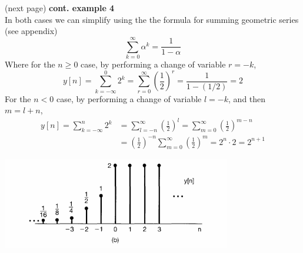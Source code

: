 \documentclass{report}
\begin{document}
(next page)\newpage
\noindent\textbf{cont. example 4}\\
In both cases we can simplify using the the formula for summing geometric series (see appendix)
\begin{equation*}
\sum^\infty_{k=0}\alpha^k=\frac{1}{1-\alpha}
\end{equation*}
Where for the $n\geq0$ case, by performing a change of variable 
$r=-k$,
\begin{equation*}
y[n]=\sum^0_{k=-\infty}2^k=\sum^{\infty}_{r=0}\left(\frac{1}{2}\right)^r=\frac{1}{1-(1/2)}=2
\end{equation*}
For the $n<0$ case, by performing a change of variable $l=-k$, and then $m=l+n$,
\begin{align*}
y[n]=\sum^n_{k=-\infty}2^k&=\sum^{\infty}_{l=-n}\left(\frac{1}{2}\right)^l=\sum^{\infty}_{m=0}\left(\frac{1}{2}\right)^{m-n}
\\
&=\left(\frac{1}{2}\right)^{-n}\sum^{\infty}_{m=0}\left(\frac{1}{2}\right)^{m}=2^n\cdot2=2^{n+1}
\end{align*}
\begin{center}
\includegraphics[width=10cm]{a28}\\
\end{center}
\newpage
\end{document}
